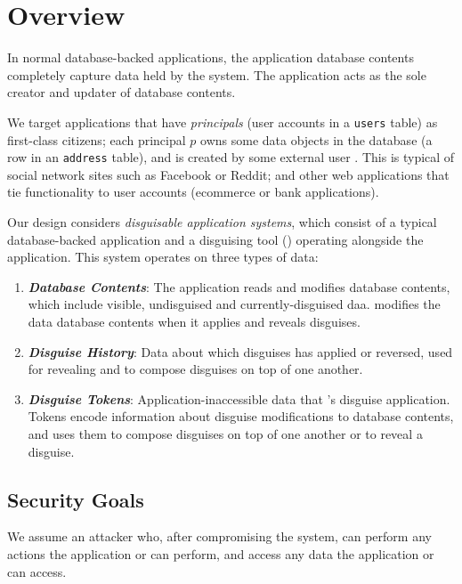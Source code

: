 \section{Overview}
In normal database-backed applications, the application database contents completely capture data
held by the system. The application acts as the sole creator and updater of database contents. 

We target applications that have \emph{principals} (\ie user accounts in a \texttt{users} table) as
first-class citizens; each principal $p$ owns some data objects in the database (\eg a row in an
\texttt{address} table), and is created by some external user .
%
This is typical of social network sites such as Facebook or Reddit; and other web applications that
tie functionality to user accounts (\eg ecommerce or bank applications).

Our design considers \emph{disguisable application systems}, which consist of a typical database-backed
application and a disguising tool (\sys) operating alongside the application. This system operates
on three types of data:
\begin{enumerate}
    \item \emph{\textbf{Database Contents}}: The application reads and modifies database
        contents, which include visible, undisguised and currently-disguised daa.
        \sys modifies the data database contents when it applies and reveals disguises.
    \item \emph{\textbf{Disguise History}}: Data about which disguises \sys has applied or
        reversed, used for revealing and to compose disguises on top of one another.
    \item \emph{\textbf{Disguise Tokens}}: Application-inaccessible data that \sys's disguise application.
        Tokens encode information about disguise modifications to database contents, and \sys uses
        them to compose disguises on top of one another or to reveal a disguise.
\end{enumerate}

\subsection{Security Goals}
We assume an attacker who, after compromising the system, can perform any actions the
application or \sys can perform, and access any data the application or \sys can access.

